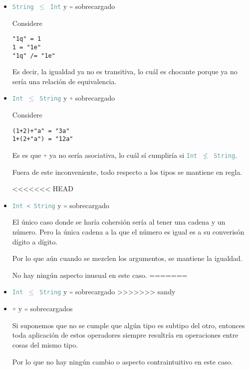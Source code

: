 \documentclass{article}
\newcommand{\tp}[1]{\textcolor{CadetBlue} {\texttt{#1}}}
\begin{document}
\begin{enumerate}
\begin{itemize}
            \item \tp{String $\leq$ Int} y \tp{=} sobrecargado

            Considere

            \begin{verbatim}
"1q" = 1
1 = "1e"
"1q" /= "1e"
            \end{verbatim}

            Es decir, la igualdad ya no es transitiva, lo cuál es chocante
            porque ya no sería una relación de equivalencia.

            \item \tp{Int $\leq$ String} y \tp{+} sobrecargado

            Considere

            \begin{verbatim}
(1+2)+"a" = "3a"
1+(2+"a") = "12a"
            \end{verbatim}

            Es es que \tp{+} ya no sería asociativa, lo cuál sí cumpliría si
            \tp{Int $\not \leq$ String}.

            Fuera de este inconveniente, todo respecto a los tipos se mantiene
            en regla.

<<<<<<< HEAD
            \item \tp{Int < String} y \tp{=} sobrecargado

            El único caso donde se haría cohersión sería al tener una cadena y 
            un número. Pero la única cadena a la que el número es igual es a su 
            converisón dígito a dígito.

            Por lo que aún cuando se mezclen los argumentos, se mantiene la 
            igualdad.

            No hay ningún aspecto inusual en este caso.
=======
            \item \tp{Int $\leq$ String} y \tp{=} sobrecargado
>>>>>>> sandy
            \item \tp{+} y \tp{=} sobrecargados

            Si suponemos que no se cumple que algún tipo es subtipo del otro,
            entonces toda aplicación de estos operadores siempre resultría en 
            operaciones entre cosas del mismo tipo.

            Por lo que no hay ningún cambio o aspecto contraintuitivo en este 
            caso.
        \end{itemize}


\end{enumerate}
\end{document}
